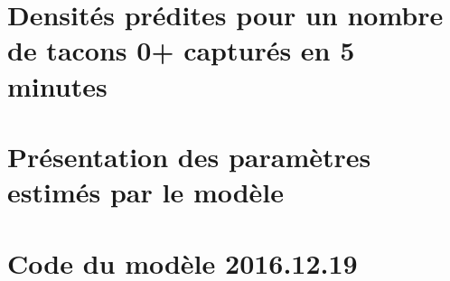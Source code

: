 \documentclass[a4paper,12pt]{report}
\begin{document}
\chapter{Densités prédites pour un
nombre de tacons 0+ capturés en 5 minutes}
\label{Annexe4}



\chapter{Présentation des paramètres estimés par le modèle}
\label{Annexe5}
\begin{landscape}

\end{landscape}
\clearpage

\chapter{Code du modèle 2016.12.19}
\label{Annexe6}
\begin{landscape}

\end{landscape}


\end{document}
